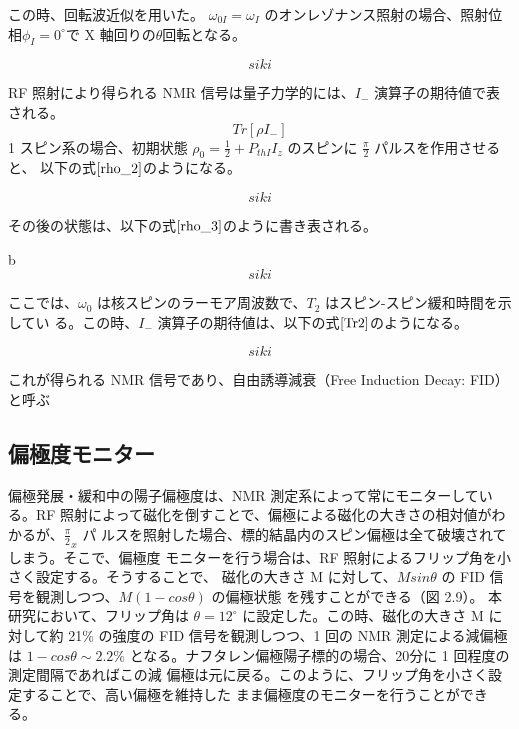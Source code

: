 この時、回転波近似を用いた。
$\omega_{0I} = \omega_I$ のオンレゾナンス照射の場合、照射位相$\phi_I=0^\circ$で X 軸回りの$\theta$回転となる。

\begin{equation}
  siki
  \label{RX}
\end{equation}

RF 照射により得られる NMR 信号は量子力学的には、$I_-$ 演算子の期待値で表される。
\begin{equation}
  Tr[\rho I_-]
  \label{Tr}
\end{equation}
1 スピン系の場合、初期状態 $\rho_0 =\frac{1}{2}+P_{thI}I_z$ のスピンに $\frac{\pi}{2}$ パルスを作用させると、
以下の式$\ref{rho_2}$のようになる。

\begin{equation}
  siki
  \label{rho_2}
\end{equation}

その後の状態は、以下の式$\ref{rho_3}$のように書き表される。

b\begin{equation}
  siki
  \label{rho_3}
\end{equation}

ここでは、$\omega_0$ は核スピンのラーモア周波数で、$T_2$ はスピン-スピン緩和時間を示してい
る。この時、$I_-$ 演算子の期待値は、以下の式$\ref{Tr2}$のようになる。

\begin{equation}
  siki
  \label{Tr2}
\end{equation}

これが得られる NMR 信号であり、自由誘導減衰（Free Induction Decay: FID）と呼ぶ

\subsection{偏極度モニター}
偏極発展・緩和中の陽子偏極度は、NMR 測定系によって常にモニターしている。RF
照射によって磁化を倒すことで、偏極による磁化の大きさの相対値がわかるが、${\frac{\pi}{2}}_x$ パ
ルスを照射した場合、標的結晶内のスピン偏極は全て破壊されてしまう。そこで、偏極度
モニターを行う場合は、RF 照射によるフリップ角を小さく設定する。そうすることで、
磁化の大きさ M に対して、$Msin\theta$ の FID 信号を観測しつつ、$M(1 − cos \theta)$ の偏極状態
を残すことができる（図 2.9）。
本研究において、フリップ角は $\theta =12^{\circ}$ に設定した。この時、磁化の大きさ M に対して約
21$\%$ の強度の FID 信号を観測しつつ、1 回の NMR 測定による減偏極は $1-cos \theta \sim 2.2\%$
となる。ナフタレン偏極陽子標的の場合、20分に 1 回程度の測定間隔であればこの減
偏極は元に戻る。このように、フリップ角を小さく設定することで、高い偏極を維持した
まま偏極度のモニターを行うことができる。



